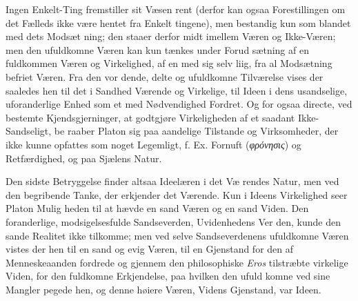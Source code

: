 \documentclass[12pt,a4paper]{book}
\newcommand{\gk}[1]{\textit{#1}}
\begin{document}
Ingen Enkelt-Ting fremstiller sit Væsen rent (derfor kan ogsaa
Forestillingen om det Fælleds ikke være hentet fra Enkelt\-%
tingene), men bestandig kun som blandet med dets Modsæt\-%
ning; den staaer derfor midt imellem Væren og Ikke-Væren;
men den ufuldkomne Væren kan kun tænkes under Forud\-%
sætning af en fuldkommen Væren og Virkelighed, af en med
sig selv liig, fra al Modsætning befriet Væren. Fra den vor\-%
dende, delte og ufuldkomne Tilværelse vises der saaledes hen
til det i Sandhed Værende og Virkelige, til Ideen i dens
usandselige, uforanderlige Enhed som et med Nødvendighed
Fordret. Og for ogsaa directe, ved bestemte Kjendsgjerninger,
at godtgjøre Virkeligheden af et saadant Ikke-Sandseligt, be\-%
raaber Platon sig paa aandelige Tilstande og Virksomheder,
der ikke kunne opfattes som noget Legemligt, f. Ex. Fornuft
(\gk{φρόνησις}) og Retfærdighed, og paa Sjælens Natur.

Den sidste Betryggelse finder altsaa Ideelæren i det Væ\-%
rendes Natur, men ved den begribende Tanke, der erkjender
det Værende. Kun i Ideens Virkelighed seer Platon Mulig\-%
heden til at hævde en sand Væren og en sand Viden. Den
foranderlige, modsigelsesfulde Sandseverden, Uvidenhedens Ver\-%
den, kunde den sande Realitet ikke tilkomme; men ved selve
Sandseverdenens ufuldkomne Væren vistes der hen til en sand
og evig Væren, til en Gjenstand for den af Menneskeaanden
fordrede og gjennem den philosophiske \emph{Eros} tilstræbte virkelige
Viden, for den fuldkomne Erkjendelse, paa hvilken den ufuld\-%
komne ved sine Mangler pegede hen, og denne høiere Væren,
Videns Gjenstand, var Ideen.
\end{document}
